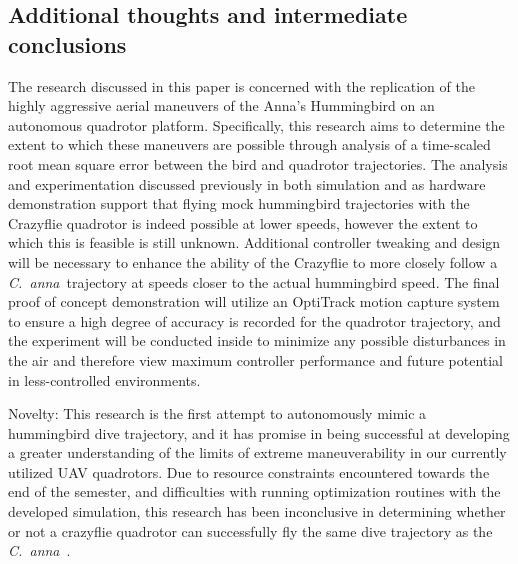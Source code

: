 \documentclass[onecolumn,10pt]{IEEEtran}
\newcommand{\Canna}{\emph{C.~anna}}
\begin{document}
\subsection{Additional thoughts and intermediate conclusions}
The research discussed in this paper is concerned with the replication of the highly aggressive aerial maneuvers of the Anna’s Hummingbird on an autonomous quadrotor platform. Specifically, this research aims to determine the extent to which these maneuvers are possible through analysis of a time-scaled root mean square error between the bird and quadrotor trajectories. The analysis and experimentation discussed previously in both simulation and as hardware demonstration support that flying mock hummingbird trajectories with the Crazyflie quadrotor is indeed possible at lower speeds, however the extent to which this is feasible is still unknown. Additional controller tweaking and design will be necessary to enhance the ability of the Crazyflie to more closely follow a \Canna\ trajectory at speeds closer to the actual hummingbird speed. The final proof of concept demonstration will utilize an OptiTrack motion capture system to ensure a high degree of accuracy is recorded for the quadrotor trajectory, and the experiment will be conducted inside to minimize any possible disturbances in the air and therefore view maximum controller performance and future potential in less-controlled environments. 

Novelty: This research is the first attempt to autonomously mimic a hummingbird dive trajectory, and it has promise in being successful at developing a greater understanding of the limits of extreme maneuverability in our currently utilized UAV quadrotors. Due to resource constraints encountered towards the end of the semester, and difficulties with running optimization routines with the developed simulation, this research has been inconclusive in determining whether or not a crazyflie quadrotor can successfully fly the same dive trajectory as the \Canna\ . 

\end{document}
